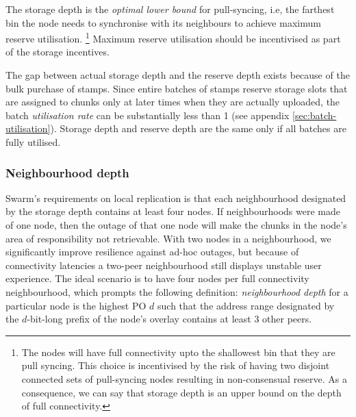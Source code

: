 The storage depth is the \emph{optimal lower bound} for pull-syncing, i.e, the farthest bin the node needs to synchronise with its neighbours to achieve maximum reserve   utilisation.%
%
\footnote{The nodes will have full connectivity upto the shallowest bin that they are pull syncing. This choice is incentivised by the risk of having two disjoint connected sets of pull-syncing nodes resulting in non-consensual reserve. As a consequence, we can say that storage depth is an upper bound on the depth of full connectivity.}
%
Maximum reserve utilisation should be incentivised as part of the storage incentives. 







The gap between actual storage depth and the  reserve depth exists because of the bulk purchase of stamps. Since entire batches of stamps reserve storage slots that are assigned to  chunks only at later times when they are actually uploaded, the batch \emph{utilisation rate} can be substantially less than 1 (see appendix \ref{sec:batch-utilisation}). Storage depth and reserve depth are the same only if all batches are fully utilised. 


\subsubsection{Neighbourhood depth}

Swarm's requirements on local replication is that each neighbourhood designated by the storage depth contains at least four nodes. 
If neighbourhoods were made of one node, then the outage of that one node will make  the chunks in the node's area of responsibility not retrievable.
With two nodes in a neighbourhood, we significantly improve resilience against ad-hoc outages, but because of connectivity latencies a two-peer neighbourhood still displays unstable user experience.
The ideal scenario is to have four nodes per full connectivity neighbourhood, which prompts the following definition: \emph{neighbourhood depth} for a particular node is the highest PO $d$ such that the address range designated by the $d$-bit-long prefix of the node's overlay contains at least 3 other peers.


